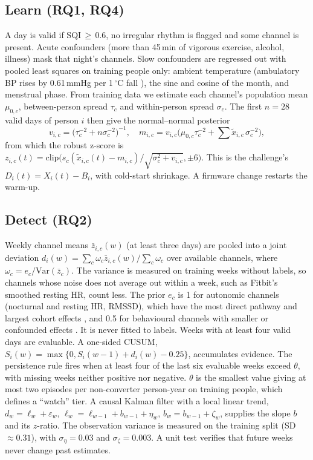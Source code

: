 \documentclass[conference]{IEEEtran}
\begin{document}
\subsection{Learn (RQ1, RQ4)}
A day is valid if SQI\,$\geq$\,0.6, no irregular rhythm is flagged and some channel is present. Acute confounders (more than 45\,min of vigorous exercise, alcohol, illness) mask that night's channels. Slow confounders are regressed out with pooled least squares on training people only: ambient temperature (ambulatory BP rises by 0.61\,mmHg per 1\,$^\circ$C fall \cite{liu2025}), the sine and cosine of the month, and menstrual phase. From training data we estimate each channel's population mean $\mu_{0,c}$, between-person spread $\tau_c$ and within-person spread $\sigma_c$. The first $n=28$ valid days of person $i$ then give the normal--normal posterior
\begin{equation}
v_{i,c}=\big(\tau_c^{-2}+n\sigma_c^{-2}\big)^{-1},\quad m_{i,c}=v_{i,c}\big(\mu_{0,c}\tau_c^{-2}+\textstyle\sum\tilde{x}_{i,c}\,\sigma_c^{-2}\big),
\end{equation}
from which the robust z-score is $z_{i,c}(t)=\mathrm{clip}\big(s_c(\tilde{x}_{i,c}(t)-m_{i,c})/\sqrt{\sigma_c^2+v_{i,c}},\pm6\big)$. This is the challenge's $D_i(t)=X_i(t)-B_i$, with cold-start shrinkage. A firmware change restarts the warm-up.

\subsection{Detect (RQ2)}
Weekly channel means $\bar{z}_{i,c}(w)$ (at least three days) are pooled into a joint deviation $d_i(w)=\sum_c \omega_c\bar{z}_{i,c}(w)/\sum_c \omega_c$ over available channels, where $\omega_c=e_c/\mathrm{Var}(\bar{z}_c)$. The variance is measured on training weeks without labels, so channels whose noise does not average out within a week, such as Fitbit's smoothed resting HR, count less. The prior $e_c$ is 1 for autonomic channels (nocturnal and resting HR, RMSSD), which have the most direct pathway and largest cohort effects \cite{kang2022}, and 0.5 for behavioural channels with smaller or confounded effects \cite{master2022,zheng2024}. It is never fitted to labels. Weeks with at least four valid days are evaluable. A one-sided CUSUM, $S_i(w)=\max\{0,S_i(w-1)+d_i(w)-0.25\}$, accumulates evidence. The persistence rule fires when at least four of the last six evaluable weeks exceed $\theta$, with missing weeks neither positive nor negative. $\theta$ is the smallest value giving at most two episodes per non-converter person-year on training people, which defines a ``watch'' tier. A causal Kalman filter with a local linear trend, $d_w=\ell_w+\varepsilon_w$, $\ell_w=\ell_{w-1}+b_{w-1}+\eta_w$, $b_w=b_{w-1}+\zeta_w$, supplies the slope $b$ and its $z$-ratio. The observation variance is measured on the training split (SD $\approx0.31$), with $\sigma_\eta=0.03$ and $\sigma_\zeta=0.003$. A unit test verifies that future weeks never change past estimates.
\end{document}

